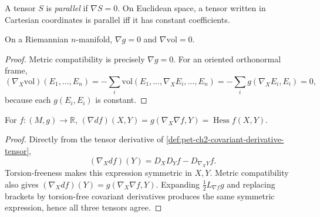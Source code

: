 \begin{definition}
  \label{def:pet-ch2-parallel-tensor}


  A tensor $S$ is \emph{parallel} if $\nabla S=0$. On Euclidean space, a
  tensor written in Cartesian coordinates is parallel iff it has constant
  coefficients.
\end{definition}

\begin{proposition}
  \label{prop:pet-ch2-metric-volume-parallel}


  On a Riemannian $n$-manifold, $\nabla g=0$ and $\nabla\mathrm{vol}=0$.
\end{proposition}
\begin{proof}

  \sketch
  Metric compatibility is precisely
  $\nabla g=0$. For an oriented orthonormal frame,
  \[
    (\nabla_X\mathrm{vol})(E_1,\dots,E_n)
      =-\sum_i\mathrm{vol}(E_1,\dots,\nabla_XE_i,\dots,E_n)
      =-\sum_i g(\nabla_XE_i,E_i)=0,
  \]
  because each $g(E_i,E_i)$ is constant.
\end{proof}

\begin{proposition}
  \label{prop:pet-ch2-hessian-covariant-derivative}


  For $f:(M,g)\to\mathbb{R}$, $(\nabla df)(X,Y)=g(\nabla_X\nabla f,Y)=\operatorname{Hess}f(X,Y)$.
\end{proposition}
\begin{proof}

  \sketch
  Directly from the tensor derivative of
  \cref{def:pet-ch2-covariant-derivative-tensor},
  \[
    (\nabla_Xdf)(Y)=D_XD_Yf-D_{\nabla_XY}f.
  \]
  Torsion-freeness makes this expression symmetric in $X,Y$. Metric
  compatibility also gives
  $(\nabla_Xdf)(Y)=g(\nabla_X\nabla f,Y)$. Expanding
  $\tfrac12L_{\nabla f}g$ and replacing brackets by torsion-free covariant
  derivatives produces the same symmetric expression, hence all three
  tensors agree.
\end{proof}

